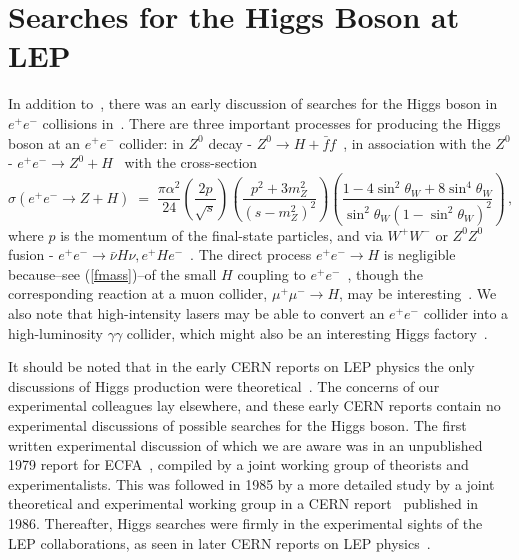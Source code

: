 \documentclass[12pt]{article}
\newcommand{\beq}{\begin{equation}}
\newcommand{\eeq}{\end{equation}}
\numberwithin{equation}{section}
\begin{document}
\section{Searches for the Higgs Boson at LEP}

In addition to~\cite{EGN}, there was an early discussion of searches
for the Higgs boson in $e^+ e^-$ collisions in~\cite{EG76}.  There are
three important processes for producing the Higgs boson at an $e^+
e^-$ collider: in $Z^0$ decay - $Z^0 \to H + {\bar
  f}f$~\cite{EG76,Bj}, in association with the $Z^0$ - $e^+ e^- \to
Z^0 + H$~\cite{EGN} with the cross-section~\cite{IK,LQT}
\beq
\sigma(e^+ e^- \to Z + H) \; = \; \frac{\pi \alpha^2}{24} \left( \frac{2 p}{\sqrt{s}}\right) \left( \frac{p^2 + 3 m_Z^2}{(s - m_Z^2)^2} \right)
\left( \frac{1 - 4 \sin^2\theta_W + 8 \sin^4 \theta_W}{\sin^2 \theta_W (1 - \sin^2 \theta_W)^2} \right) \, ,
\eeq
where $p$ is the momentum of the final-state particles, and via $W^+ W^-$ or $Z^0 Z^0$ fusion -
$e^+ e^- \to {\bar \nu} H \nu, e^+ H e^-$~\cite{JP}.  The direct
process $e^+ e^- \to H$ is negligible because--see (\ref{fmass})--of the
small $H$ coupling to $e^+ e^-$~\cite{EGN}, though the corresponding
reaction at a muon collider, $\mu^+ \mu^- \to H$, may be
interesting~\cite{mumu}.  We also note that high-intensity lasers may
be able to convert an $e^+ e^-$ collider into a high-luminosity
$\gamma \gamma$ collider, which might also be an interesting Higgs
factory~\cite{gammagamma}.

It should be noted that in the early CERN reports on LEP physics the only
discussions of Higgs production were theoretical~\cite{EG76,LesHouches}. The concerns of our
experimental colleagues lay elsewhere, and these early CERN reports contain no experimental
discussions of possible searches for the Higgs boson. The first written experimental discussion of
which we are aware was in an unpublished 1979 report for ECFA~\cite{ECFA}, compiled by a joint working group
of theorists and experimentalists. This was followed in 1985 by a more detailed study by a
joint theoretical and experimental working group in a CERN report~\cite{LEP85} published in 1986.
Thereafter, Higgs searches were firmly in the experimental sights of the LEP collaborations, as seen
in later CERN reports on LEP physics~\cite{sights}.
\end{document}

